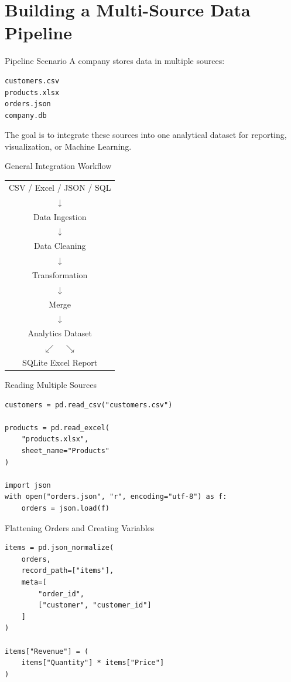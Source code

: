 \documentclass[aspectratio=169,11pt]{beamer}
\begin{document}
\section{Building a Multi-Source Data Pipeline}

\begin{frame}[fragile]{Pipeline Scenario}
A company stores data in multiple sources:
\begin{lstlisting}[style=textstyle]
customers.csv
products.xlsx
orders.json
company.db
\end{lstlisting}

The goal is to integrate these sources into one analytical dataset for reporting, visualization, or Machine Learning.
\end{frame}

\begin{frame}{General Integration Workflow}
\begin{center}
\begin{tabular}{c}
CSV / Excel / JSON / SQL \\
$\downarrow$ \\
Data Ingestion \\
$\downarrow$ \\
Data Cleaning \\
$\downarrow$ \\
Transformation \\
$\downarrow$ \\
Merge \\
$\downarrow$ \\
Analytics Dataset \\
$\swarrow \quad \searrow$ \\
SQLite \qquad Excel Report
\end{tabular}
\end{center}
\end{frame}

\begin{frame}[fragile]{Reading Multiple Sources}
\begin{lstlisting}[style=pythonstyle]
customers = pd.read_csv("customers.csv")

products = pd.read_excel(
    "products.xlsx",
    sheet_name="Products"
)

import json
with open("orders.json", "r", encoding="utf-8") as f:
    orders = json.load(f)
\end{lstlisting}
\end{frame}

\begin{frame}[fragile]{Flattening Orders and Creating Variables}
\begin{lstlisting}[style=pythonstyle]
items = pd.json_normalize(
    orders,
    record_path=["items"],
    meta=[
        "order_id",
        ["customer", "customer_id"]
    ]
)

items["Revenue"] = (
    items["Quantity"] * items["Price"]
)
\end{lstlisting}
\end{frame}
\end{document}
